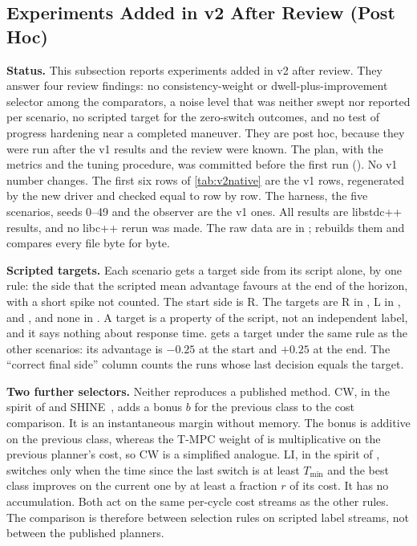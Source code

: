 \subsection{Experiments Added in v2 After Review (Post Hoc)}\label{subsec:v2}

\noindent\textbf{Status.} This subsection reports experiments added in v2 after review. They answer four review findings: no consistency-weight or dwell-plus-improvement selector among the comparators, a noise level that was neither swept nor reported per scenario, no scripted target for the zero-switch outcomes, and no test of progress hardening near a completed maneuver. They are post hoc, because they were run after the v1 results and the review were known. The plan, with the metrics and the tuning procedure, was committed before the first run (). No v1 number changes. The first six rows of \cref{tab:v2native} are the v1 rows, regenerated by the new driver and checked equal to  row by row. The harness, the five scenarios, seeds 0--49 and the observer are the v1 ones. All results are libstdc++ results, and no libc++ rerun was made. The raw data are in ;  rebuilds them and compares every file byte for byte.

\noindent\textbf{Scripted targets.} Each scenario gets a target side from its script alone, by one rule: the side that the scripted mean advantage favours at the end of the horizon, with a short spike not counted. The start side is R. The targets are R in , L in ,  and , and none in . A target is a property of the script, not an independent label, and it says nothing about response time.  gets a target under the same rule as the other scenarios: its advantage is $-0.25$ at the start and $+0.25$ at the end. The ``correct final side'' column counts the runs whose last decision equals the target.

\noindent\textbf{Two further selectors.} Neither reproduces a published method. CW, in the spirit of \citet{degroot2024topology} and SHINE~\citep{martinezbaselga2026shine}, adds a bonus $b$ for the previous class to the cost comparison. It is an instantaneous margin without memory. The bonus is additive on the previous class, whereas the T-MPC weight of \citet{degroot2024topology} is multiplicative on the previous planner's cost, so CW is a simplified analogue. LI, in the spirit of \citet{li2026bigcbf}, switches only when the time since the last switch is at least $T_{\min}$ and the best class improves on the current one by at least a fraction $r$ of its cost. It has no accumulation. Both act on the same per-cycle cost streams as the other rules. The comparison is therefore between selection rules on scripted label streams, not between the published planners.

